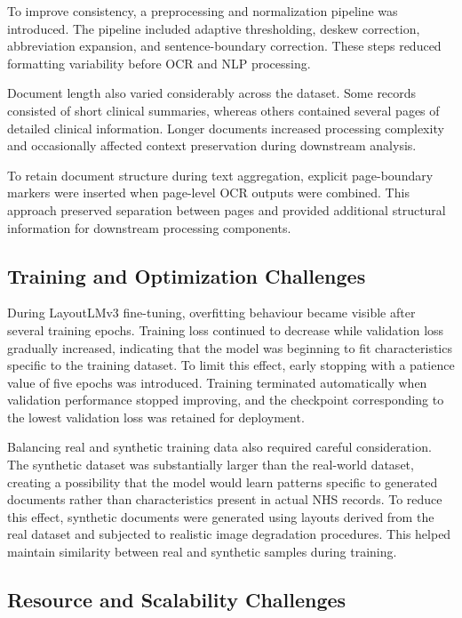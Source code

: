 To improve consistency, a preprocessing and normalization pipeline was introduced. The pipeline included adaptive thresholding, deskew correction, abbreviation expansion, and sentence-boundary correction. These steps reduced formatting variability before OCR and NLP processing.

Document length also varied considerably across the dataset. Some records consisted of short clinical summaries, whereas others contained several pages of detailed clinical information. Longer documents increased processing complexity and occasionally affected context preservation during downstream analysis.

To retain document structure during text aggregation, explicit page-boundary markers were inserted when page-level OCR outputs were combined. This approach preserved separation between pages and provided additional structural information for downstream processing components.

\subsection{Training and Optimization Challenges}

During LayoutLMv3 fine-tuning, overfitting behaviour became visible after several training epochs. Training loss continued to decrease while validation loss gradually increased, indicating that the model was beginning to fit characteristics specific to the training dataset. To limit this effect, early stopping with a patience value of five epochs was introduced. Training terminated automatically when validation performance stopped improving, and the checkpoint corresponding to the lowest validation loss was retained for deployment.

Balancing real and synthetic training data also required careful consideration. The synthetic dataset was substantially larger than the real-world dataset, creating a possibility that the model would learn patterns specific to generated documents rather than characteristics present in actual NHS records. To reduce this effect, synthetic documents were generated using layouts derived from the real dataset and subjected to realistic image degradation procedures. This helped maintain similarity between real and synthetic samples during training.

\subsection{Resource and Scalability Challenges}

